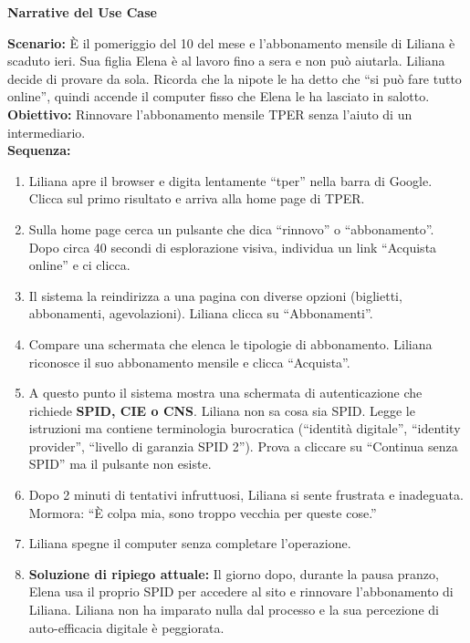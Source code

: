 \documentclass[11pt,a4paper]{article}
\begin{document}
\begin{tcolorbox}[colback=backgroundColor,colframe=borderColor,arc=2mm]
    \textbf{Narrative del Use Case} \\[4pt]
    {\small
    \textbf{Scenario:} \`E il pomeriggio del 10 del mese e l'abbonamento mensile di Liliana \`e scaduto ieri. Sua figlia Elena \`e al lavoro fino a sera e non pu\`o aiutarla. Liliana decide di provare da sola. Ricorda che la nipote le ha detto che ``si pu\`o fare tutto online'', quindi accende il computer fisso che Elena le ha lasciato in salotto. \\[4pt]

    \textbf{Obiettivo:} Rinnovare l'abbonamento mensile TPER senza l'aiuto di un intermediario. \\[4pt]

    \textbf{Sequenza:}
    \begin{enumerate}
        \item Liliana apre il browser e digita lentamente ``tper'' nella barra di Google. Clicca sul primo risultato e arriva alla home page di TPER.
        \item Sulla home page cerca un pulsante che dica ``rinnovo'' o ``abbonamento''. Dopo circa 40 secondi di esplorazione visiva, individua un link ``Acquista online'' e ci clicca.
        \item Il sistema la reindirizza a una pagina con diverse opzioni (biglietti, abbonamenti, agevolazioni). Liliana clicca su ``Abbonamenti''.
        \item Compare una schermata che elenca le tipologie di abbonamento. Liliana riconosce il suo abbonamento mensile e clicca ``Acquista''.
        \item A questo punto il sistema mostra una schermata di autenticazione che richiede \textbf{SPID, CIE o CNS}. Liliana non sa cosa sia SPID. Legge le istruzioni ma contiene terminologia burocratica (``identit\`a digitale'', ``identity provider'', ``livello di garanzia SPID 2''). Prova a cliccare su ``Continua senza SPID'' ma il pulsante non esiste.
        \item Dopo 2 minuti di tentativi infruttuosi, Liliana si sente frustrata e inadeguata. Mormora: ``\`E colpa mia, sono troppo vecchia per queste cose.''
        \item Liliana spegne il computer senza completare l'operazione.
        \item \textbf{Soluzione di ripiego attuale:} Il giorno dopo, durante la pausa pranzo, Elena usa il proprio SPID per accedere al sito e rinnovare l'abbonamento di Liliana. Liliana non ha imparato nulla dal processo e la sua percezione di auto-efficacia digitale \`e peggiorata.
    \end{enumerate}

}
\end{tcolorbox}
\end{document}
